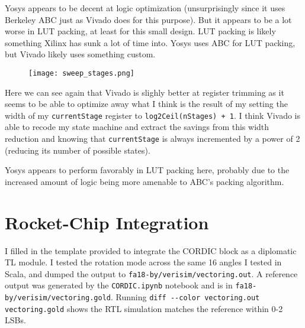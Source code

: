 Yosys appears to be decent at logic optimization (unsurprisingly since it uses Berkeley ABC just as Vivado does for this purpose). But it appears to be a lot worse in LUT packing, at least for this small design. LUT packing is likely something Xilinx has sunk a lot of time into. Yosys uses ABC for LUT packing, but Vivado likely uses something custom.

\begin{figure}[H]
    \centerline{\texttt{[image: sweep\_stages.png]}}
\end{figure}

Here we can see again that Vivado is slighly better at register trimming as it seems to be able to optimize away what I think is the result of my setting the width of my \verb|currentStage| register to \verb|log2Ceil(nStages) + 1|. I think Vivado is able to recode my state machine and extract the savings from this width reduction and knowing that \verb|currentStage| is always incremented by a power of 2 (reducing its number of possible states).

Yosys appears to perform favorably in LUT packing here, probably due to the increased amount of logic being more amenable to ABC's packing algorithm.

\section{Rocket-Chip Integration}
I filled in the template provided to integrate the CORDIC block as a diplomatic TL module. I tested the rotation mode across the same 16 angles I tested in Scala, and dumped the output to \verb|fa18-by/verisim/vectoring.out|. A reference output was generated by the \verb|CORDIC.ipynb| notebook and is in \verb|fa18-by/verisim/vectoring.gold|. Running \verb|diff --color vectoring.out vectoring.gold| shows the RTL simulation matches the reference within 0-2 LSBs.


